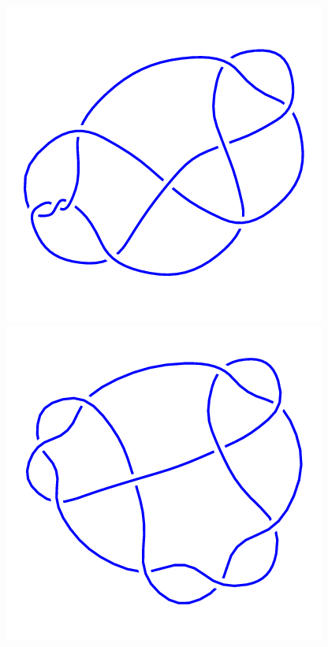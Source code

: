 \begin{figure}[H]
	\begin{minipage}[b]{.18\linewidth}
		\centering
		\includegraphics[width=\linewidth]{../data/10_27.png}
	\end{minipage}
	\begin{minipage}[b]{.18\linewidth}
		\centering
		\includegraphics[width=\linewidth]{../data/10_28.png}

\end{minipage}
\end{figure}
